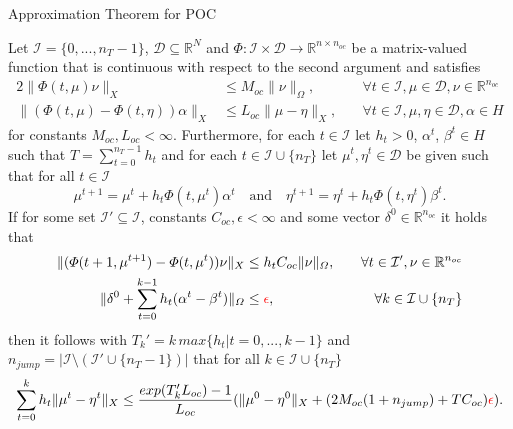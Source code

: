 \documentclass[8pt]{beamer}
\newcommand\Fontvi{\fontsize{6}{7.2}\selectfont}
\begin{document}
\begin{frame}{Approximation Theorem for POC}
\Fontvi
\begin{theorem} []
Let $\mathcal{I}  = \{0,...,n_T-1\}$,  $\mathcal{D} \subseteq \mathbb{R}^N$ and $\Phi: \mathcal{I} \times \mathcal{D} \rightarrow \mathbb{R}^{n \times n_{oc}}$ be a matrix-valued function that is continuous with respect to the second argument and satisfies
\begin{alignat}{2}
\| \Phi(t,\mu) \nu \|_X &\leq M_{oc} \|\nu \|_{\Omega}, &\quad \forall t \in \mathcal{I},  \mu \in \mathcal{D}, \nu \in \mathbb{R}^{n_{oc}} \\
\| (\Phi(t,\mu) -\Phi(t,\eta)) \alpha \|_X &\leq L_{oc} \| \mu - \eta \|_{X}, &\quad \forall t \in \mathcal{I}, \mu, \eta \in \mathcal{D}, \alpha \in H 
\end{alignat}
for constants $M_{oc}, L_{oc} < \infty$.  Furthermore,  for each $t \in \mathcal{I}$ let $h_t >0$,  $\alpha^t$,   $\beta^t \in H$ such that $T = \sum_{t=0}^{n_T - 1} h_t$ and for each $t \in \mathcal{I} \cup \{n_T\}$ let $\mu^t,  \eta^t \in \mathcal{D}$ be given such that for all $t \in \mathcal{I}$ 
\begin{equation}
\mu^{t+1} = \mu^t + h_t\Phi(t,\mu^t)\alpha^t  \quad \textrm{and} \quad \eta^{t+1} = \eta^t + h_t\Phi(t,\eta^t)\beta^t.
\end{equation}
If for some set $\mathcal{I}' \subseteq \mathcal{I}$, constants $C_{oc}, \epsilon < \infty$ and some vector $\delta^0 \in \mathbb{R}^{n_{oc}}$ it holds that 
\begin{alignat}{2}
\| (\Phi(t+1,\mu^{t+1}) - \Phi(t, \mu^t)) \nu \|_X &\leq h_t C_{oc} \| \nu \|_{\Omega},  \quad &\forall t \in \mathcal{I}', \nu \in \mathbb{R}^{n_{oc}} \\
\| \delta^0 + \sum_{t=0}^{k-1} h_t(\alpha^t - \beta^t) \|_{\Omega} &\leq \textcolor{red}{\epsilon}, \quad &\forall k \in  \mathcal{I} \cup \{n_T\} 
\end{alignat}
then it follows with $T_k' = k\, max\{h_t | t=0,...,k-1\}$ and $n_{jump} = | \mathcal{I} \setminus (\mathcal{I}' \cup \{n_T - 1\}) |$ that for all $k \in \mathcal{I} \cup \{n_T\}$
\begin{equation}
\sum_{t=0}^k h_t \| \mu^t - \eta^t\|_X \leq \frac{exp(T_k' L_{oc})-1}{L_{oc}}(\| \mu^0 - \eta^0\|_X + (2M_{oc}(1+n_{jump}) +TC_{oc})\textcolor{red}{\epsilon}). 
\end{equation}
\end{theorem}
\end{frame}
\end{document}
